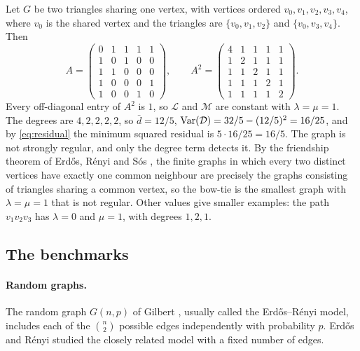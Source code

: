 \begin{example}
\label{ex:bowtie}
Let $G$ be two triangles sharing one vertex, with vertices ordered
$v_0,v_1,v_2,v_3,v_4$, where $v_0$ is the shared vertex and the triangles are
$\{v_0,v_1,v_2\}$ and $\{v_0,v_3,v_4\}$. Then
\[
  A=\begin{pmatrix}
  0&1&1&1&1\\ 1&0&1&0&0\\ 1&1&0&0&0\\ 1&0&0&0&1\\ 1&0&0&1&0
  \end{pmatrix},
  \qquad
  A^2=\begin{pmatrix}
  4&1&1&1&1\\ 1&2&1&1&1\\ 1&1&2&1&1\\ 1&1&1&2&1\\ 1&1&1&1&2
  \end{pmatrix}.
\]
Every off-diagonal entry of $A^2$ is $1$, so $\mathcal L$ and $\mathcal M$ are
constant with $\lambda=\mu=1$. The degrees are $4,2,2,2,2$, so
$\bar d=12/5$, $\operatorname{Var}(\mathcal D)=32/5-(12/5)^2=16/25$, and by
\eqref{eq:residual} the minimum squared residual is $5\cdot16/25=16/5$.
The graph is not strongly regular, and only the degree term detects it.
By the friendship theorem of Erd\H{o}s, R\'enyi and S\'os
\cite{erdos1966friendship}, the finite graphs in which every two distinct
vertices have exactly one common neighbour are precisely the graphs consisting
of triangles sharing a common vertex, so the bow-tie is the smallest graph
with $\lambda=\mu=1$ that is not regular. Other values give smaller examples:
the path $v_1v_2v_3$ has $\lambda=0$ and $\mu=1$, with degrees $1,2,1$.
\end{example}

\subsection{The benchmarks}
\label{subsec:benchmarks}

\paragraph{Random graphs.} The random graph $G(n,p)$ of Gilbert
\cite{gilbert1959}, usually called the Erd\H{o}s--R\'enyi model, includes each
of the $\binom n2$ possible edges independently with probability $p$. Erd\H{o}s
and R\'enyi \cite{erdos1959} studied the closely related model with a fixed
number of edges.

